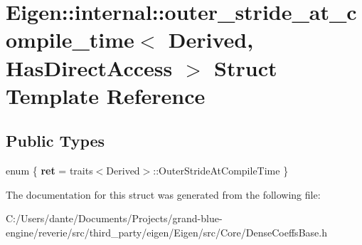 \hypertarget{struct_eigen_1_1internal_1_1outer__stride__at__compile__time}{}\section{Eigen\+::internal\+::outer\+\_\+stride\+\_\+at\+\_\+compile\+\_\+time$<$ Derived, Has\+Direct\+Access $>$ Struct Template Reference}
\label{struct_eigen_1_1internal_1_1outer__stride__at__compile__time}
\subsection*{Public Types}
\begin{DoxyCompactItemize}
\item 
\mbox{\label{struct_eigen_1_1internal_1_1outer__stride__at__compile__time_a770141142b22df2b8079bb21f0f5c610}} 
enum \{ {\bfseries ret} = traits$<$Derived$>$\+::Outer\+Stride\+At\+Compile\+Time
 \}
\end{DoxyCompactItemize}


The documentation for this struct was generated from the following file\+:\begin{DoxyCompactItemize}
\item 
C\+:/\+Users/dante/\+Documents/\+Projects/grand-\/blue-\/engine/reverie/src/third\+\_\+party/eigen/\+Eigen/src/\+Core/Dense\+Coeffs\+Base.\+h\end{DoxyCompactItemize}
